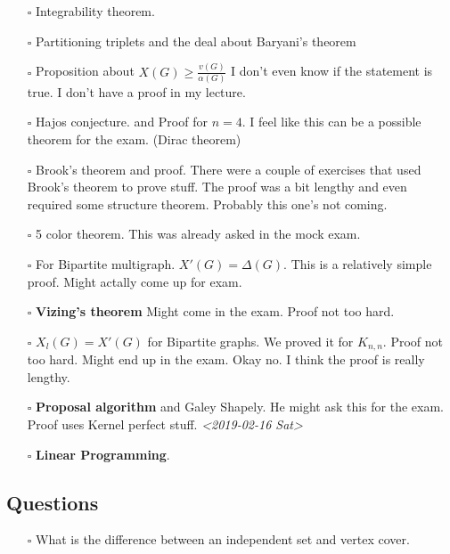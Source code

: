 \documentclass[11pt]{article}
\begin{document}
\begin{enumerate}
\item[{$\square$}] Integrability theorem.
\item[{$\square$}] Partitioning triplets and the deal about Baryani's theorem
\item[{$\square$}] Proposition about \(X(G) \ge \frac{v(G)}{\alpha(G)}\) I don't even know
if the statement is true. I don't have a proof in my lecture.
\item[{$\square$}] Hajos conjecture. and Proof for \(n = 4\). I feel like this can be a
possible theorem for the exam. (Dirac theorem)
\item[{$\square$}] Brook's theorem and proof. There were a couple of exercises that used
Brook's theorem to prove stuff. The proof was a bit lengthy and even
required some structure theorem. Probably this one's not coming.
\item[{$\square$}] 5 color theorem. This was already asked in the mock exam.
\item[{$\square$}] For Bipartite multigraph. \(X'(G) = \Delta(G)\). This is a relatively
simple proof. Might actally come up for exam.
\item[{$\square$}] \textbf{Vizing's theorem} Might come in the exam. Proof not too hard.
\item[{$\square$}] \(X_l(G) = X'(G)\) for Bipartite graphs. We proved it for \(K_{n,n}\).
Proof not too hard. Might end up in the exam. Okay no. I think the proof
is really lengthy.
\item[{$\square$}] \textbf{Proposal algorithm} and Galey Shapely. He might ask this for the
exam. Proof uses Kernel perfect stuff. \textit{<2019-02-16 Sat>}
\item[{$\square$}] \textbf{Linear Programming}.
\end{enumerate}
\subsection{Questions}
\label{sec:org809d565}
\begin{enumerate}
\item[{$\square$}] What is the difference between an independent set and vertex cover.
\end{enumerate}
\end{document}
